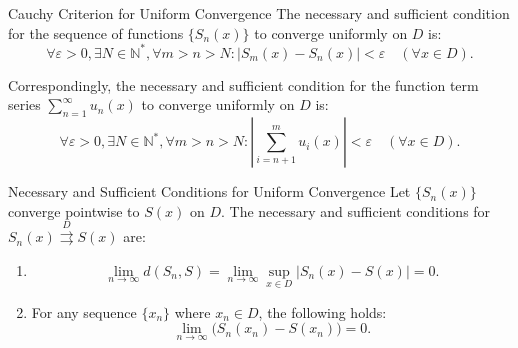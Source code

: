 \documentclass[11pt]{../../TexTemplate/elegantbook}
\begin{document}
\begin{theorem}{Cauchy Criterion for Uniform Convergence}
    The necessary and sufficient condition for the sequence of functions \( \{ S_n(x) \} \) to converge uniformly on \( D \) is:
    \[
    \forall \varepsilon > 0, \exists N \in \mathbb{N}^*, \forall m > n > N: 
    |S_m(x) - S_n(x)| < \varepsilon \quad (\forall x \in D).
    \]

    Correspondingly, the necessary and sufficient condition for the function term series 
    \( \sum_{n=1}^\infty u_n(x) \) to converge uniformly on \( D \) is:
    \[
    \forall \varepsilon > 0, \exists N \in \mathbb{N}^*, \forall m > n > N: 
    \left| \sum_{i=n+1}^m u_i(x) \right| < \varepsilon \quad (\forall x \in D).
    \]
\end{theorem}

\begin{theorem}{Necessary and Sufficient Conditions for Uniform Convergence}
    Let \( \{ S_n(x) \} \) converge pointwise to \( S(x) \) on \( D \). 
    The necessary and sufficient conditions for \( S_n(x) \mathop{\rightrightarrows}\limits^{D} S(x) \) are:
    \begin{enumerate}
        \item  
            \[
            \lim_{n \to \infty} d(S_n, S) = \lim_{n \to \infty} \sup_{x \in D} |S_n(x) - S(x)| = 0.
            \]
        \item For any sequence \( \{ x_n \} \) where \( x_n \in D \), the following holds:
            \[
            \lim_{n \to \infty} \big(S_n(x_n) - S(x_n)\big) = 0.
            \]
    \end{enumerate}
\end{theorem}
\end{document}
